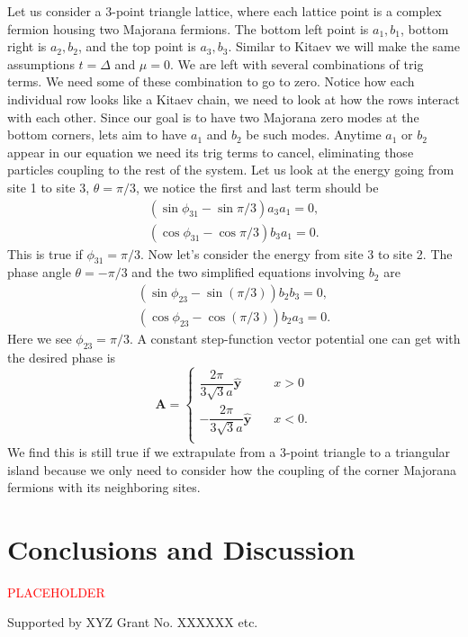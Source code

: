 \documentclass[aps,prb,showpacs,amsmath,amssymb,superscriptaddress]{revtex4-2}
\newcommand{\Red}[1]{\textcolor{red}{#1}}
\let\oldhat\hat
\renewcommand{\hat}[1]{\oldhat{\mathbf{#1}}}
\renewcommand{\vec}[1]{\mathbf{#1}}
\newcommand{\de}{\Delta}
\begin{document}
Let us consider a 3-point triangle lattice, where each lattice point is a complex fermion housing two Majorana fermions.
The bottom left point is $a_1, b_1$, bottom right is $a_2, b_2$, and the top point is $a_3, b_3$.
Similar to Kitaev we will make the same assumptions $t=\de$ and $\mu=0$.
We are left with several combinations of trig terms.
We need some of these combination to go to zero.
Notice how each individual row looks like a Kitaev chain, we need to look at how the rows interact with each other.
Since our goal is to have two Majorana zero modes at the bottom corners, lets aim to have $a_1$ and $b_2$ be such modes.
Anytime $a_1$ or $b_2$ appear in our equation we need its trig terms to cancel, eliminating those particles coupling to the rest of the system.
Let us look at the energy going from site 1 to site 3, $\theta = \pi/3$, we notice the first and last term should be
\begin{align}
  (\sin\phi_{31} - \sin\pi/3) a_3 a_1 = 0, \\
  (\cos\phi_{31} - \cos\pi/3) b_3 a_1 = 0.
\end{align}
This is true if $\phi_{31} = \pi/3$.
Now let's consider the energy from site 3 to site 2.
The phase angle $\theta = -\pi/3$ and the two simplified equations involving $b_2$ are
\begin{align}
  (\sin\phi_{23} - \sin(\pi/3)) b_2 b_3 = 0, \nonumber \\
  (\cos\phi_{23} - \cos(\pi/3)) b_2 a_3 = 0. \nonumber
\end{align}
Here we see $\phi_{23} = \pi/3$.
A constant step-function vector potential one can get with the desired phase is
\begin{equation}
  \vec{A} = \begin{cases}
      \dfrac{2 \pi}{3\sqrt{3}a} \hat{y} \quad &x > 0 \\
      -\dfrac{2 \pi}{3\sqrt{3}a} \hat{y} \quad &x < 0. \\
            \end{cases}
\end{equation}
We find this is still true if we extrapulate from a 3-point triangle to a triangular island because we only need to consider how the coupling of the corner Majorana fermions with its neighboring sites.

\section{Conclusions and Discussion}

\Red{PLACEHOLDER}


\begin{acknowledgements}
  Supported by XYZ Grant No. XXXXXX etc.
\end{acknowledgements}



\end{document}
